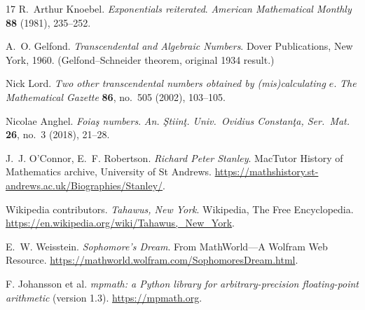 \documentclass[11pt,a4paper]{article}
\theoremstyle{plain}
\theoremstyle{definition}
\theoremstyle{remark}
\begin{document}
\begin{thebibliography}{17}
R.~Arthur Knoebel.
\emph{Exponentials reiterated}.
\emph{American Mathematical Monthly} \textbf{88} (1981), 235--252.

A.~O. Gelfond.
\emph{Transcendental and Algebraic Numbers}.
Dover Publications, New York, 1960. (Gelfond--Schneider theorem, original
1934 result.)

Nick Lord.
\emph{Two other transcendental numbers obtained by (mis)calculating $e$}.
\emph{The Mathematical Gazette} \textbf{86}, no.~505 (2002), 103--105.

Nicolae Anghel.
\emph{Foia\c{s} numbers}.
\emph{An. \c{S}tiin\c{t}. Univ.\ Ovidius Constan\c{t}a, Ser.\ Mat.}
\textbf{26}, no.~3 (2018), 21--28.

J.~J. O'Connor, E.~F. Robertson.
\emph{Richard Peter Stanley}.
MacTutor History of Mathematics archive, University of St Andrews.
\url{https://mathshistory.st-andrews.ac.uk/Biographies/Stanley/}.

Wikipedia contributors.
\emph{Tahawus, New York}.
Wikipedia, The Free Encyclopedia.
\url{https://en.wikipedia.org/wiki/Tahawus,_New_York}.

E.~W. Weisstein.
\emph{Sophomore's Dream}. From MathWorld---A Wolfram Web Resource.
\url{https://mathworld.wolfram.com/SophomoresDream.html}.

F. Johansson et al.
\emph{mpmath: a Python library for arbitrary-precision floating-point
arithmetic} (version 1.3).
\url{https://mpmath.org}.

\end{thebibliography}
\end{document}
